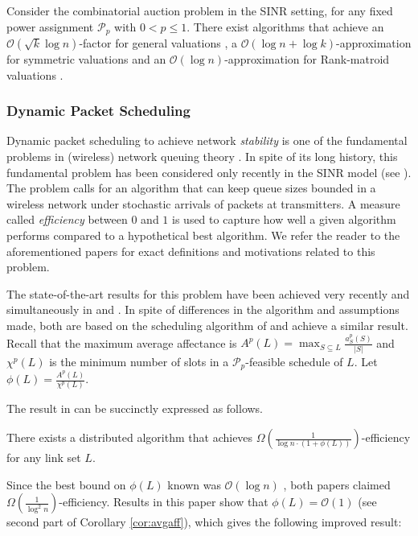 \documentclass[11pt]{amsart}
\newcommand{\cal}[1]{\mathcal{#1}}
\newcommand{\BO}{\mathcal{O}}
\def\calP{{\cal P}}
\def\calP{{\cal P}}   \def\calM{{\cal M}}   \def\calU{{\cal U}}   \newcommand{\PCopt}{\overline{OPT}}
\newcommand{\powp}{\calP_p}
\begin{document}
\begin{corollary}
Consider the combinatorial auction problem in the SINR setting, for
any fixed power assignment $\powp$ with $0 < p \leq 1$.
There exist algorithms that achieve an $\BO(\sqrt{k}\log n)$-factor for
general valuations \cite{DBLP:conf/spaa/HoeferKV11}, a
$\BO(\log n + \log k)$-approximation for symmetric valuations and an $\BO(\log n)$-approximation for Rank-matroid valuations \cite{DBLP:conf/sigecom/HoeferK12}.
\end{corollary}


\subsubsection*{Dynamic Packet Scheduling}



Dynamic packet scheduling to achieve network \emph{stability} is one of the fundamental problems in (wireless) network
queuing theory \cite{TE92}. In spite of its long history, this
fundamental problem has been considered only recently in the SINR model 
(see \cite{lqfmobihoc,kesselheimStability,sirocco12}). The problem calls for an algorithm that can keep queue sizes bounded in a wireless network under stochastic arrivals of packets at transmitters. A measure called \emph{efficiency} between $0$ and $1$ is used to capture how well a given algorithm performs compared to a hypothetical best algorithm. We refer the reader to the aforementioned papers for exact definitions and motivations related to this problem.

The state-of-the-art results for this problem have been achieved very recently and simultaneously in \cite{sirocco12} and \cite{kesselheimStability}. In spite of differences in the algorithm  and assumptions made, both are based on the scheduling
algorithm of \cite{KV10} and achieve a similar result. Recall that the maximum average affectance is $A^p(L) = \max_{S\subseteq L}\frac{a^p_S(S)}{|S|}$ and $\chi^p(L)$ is the minimum number of slots in a $\powp$-feasible schedule of $L$. Let $\phi(L) = \frac{A^p(L)}{\chi^p(L)}$. 



The result in \cite{kesselheimStability,sirocco12} can be succinctly expressed as follows.


\begin{theorem}{\cite{kesselheimStability,sirocco12}}
There exists a distributed algorithm that achieves $\Omega\left(\frac1{\log n \cdot (1+ \phi(L))}\right)$-efficiency for any link set $L$. 
\end{theorem}
Since the best bound on $\phi(L)$ known was $\BO(\log n)$ \cite{KV10}, both papers claimed $\Omega(\frac1{\log^2 n})$-efficiency. Results in this paper show that $\phi(L) = \BO(1)$ (see second part of Corollary \ref{cor:avgaff}), which gives the following improved result:
\end{document}

